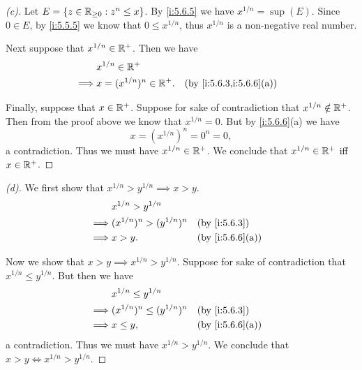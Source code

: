 \begin{proof}[(c)]
  Let \(E = \left\lbrace z \in \mathbb{R}_{\geq 0} : z^n \leq x\right\rbrace\).
  By \cref{i:5.6.5} we have \(x^{1 / n} = \sup(E)\).
  Since \(0 \in E\), by \cref{i:5.5.5} we know that \(0 \leq x^{1 / n}\), thus \(x^{1 / n}\) is a non-negative real number.

  Next suppose that \(x^{1 / n} \in \mathbb{R}^+\).
  Then we have
  \begin{align*}
             & x^{1 / n} \in \R^+                                       \\
    \implies & x = (x^{1 / n})^n \in \R^+. &  & \by{i:5.6.3,i:5.6.6}[a]
  \end{align*}

  Finally, suppose that \(x \in \mathbb{R}^+\).
  Suppose for sake of contradiction that \(x^{1 / n} \notin \mathbb{R}^+\).
  Then from the proof above we know that \(x^{1 / n} = 0\).
  But by \cref{i:5.6.6}(a) we have
  \[
    x = (x^{1 / n})^n = 0^n = 0,
  \]
  a contradiction.
  Thus we must have \(x^{1 / n} \in \mathbb{R}^+\).
  We conclude that \(x^{1 / n} \in \mathbb{R}^+\) iff \(x \in \mathbb{R}^+\).
\end{proof}

\begin{proof}[(d)]
  We first show that \(x^{1 / n} > y^{1 / n} \implies x > y\).
  \begin{align*}
             & x^{1 / n} > y^{1 / n}                              \\
    \implies & (x^{1 / n})^n > (y^{1 / n})^n &  & \by{i:5.6.3}    \\
    \implies & x > y.                        &  & \by{i:5.6.6}[a]
  \end{align*}

  Now we show that \(x > y \implies x^{1 / n} > y^{1 / n}\).
  Suppose for sake of contradiction that \(x^{1 / n} \leq y^{1 / n}\).
  But then we have
  \begin{align*}
             & x^{1 / n} \leq y^{1 / n}                              \\
    \implies & (x^{1 / n})^n \leq (y^{1 / n})^n &  & \by{i:5.6.3}    \\
    \implies & x \leq y,                        &  & \by{i:5.6.6}[a]
  \end{align*}
  a contradiction.
  Thus we must have \(x^{1 / n} > y^{1 / n}\).
  We conclude that \(x > y \iff x^{1 / n} > y^{1 / n}\).
\end{proof}

